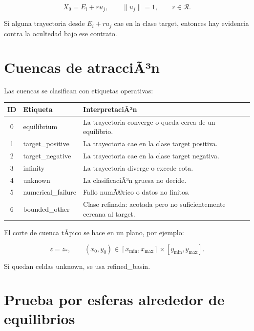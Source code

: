 \documentclass[11pt]{article}
\DeclareRobustCommand{\codepath}[1]{\begingroup\Urlmuskip=0mu plus 2mu\path{#1}\endgroup}
\def\codepath#1{#1}%
\begin{document}
\begin{equation}
X_0=E_i+r u_j,
\qquad
\|u_j\|=1,
\qquad
r\in\mathcal R.
\end{equation}

Si alguna trayectoria desde \(E_i+r u_j\) cae en la clase target, entonces hay evidencia contra la ocultedad bajo ese contrato.

\section{Cuencas de atracciÃ³n}

Las cuencas se clasifican con etiquetas operativas:

\begin{center}
\small
\begin{tabular}{@{}cL{0.32\textwidth}L{0.46\textwidth}@{}}
\toprule
ID & Etiqueta & InterpretaciÃ³n\\
 & \codepath{equilibrium} & La trayectoria converge o queda cerca de un equilibrio.\\
1 & \codepath{target_positive} & La trayectoria cae en la clase target positiva.\\
2 & \codepath{target_negative} & La trayectoria cae en la clase target negativa.\\
3 & \codepath{infinity} & La trayectoria diverge o excede cota.\\
4 & \codepath{unknown} & La clasificaciÃ³n gruesa no decide.\\
5 & \codepath{numerical_failure} & Fallo numÃ©rico o datos no finitos.\\
6 & \codepath{bounded_other} & Clase refinada: acotada pero no suficientemente cercana al target.\\
\bottomrule
\end{tabular}
\end{center}

El corte de cuenca tÃ­pico se hace en un plano, por ejemplo:

\begin{equation}
z=z_\ast,
\qquad
(x_0,y_0)\in[x_{\min},x_{\max}]\times[y_{\min},y_{\max}].
\end{equation}

Si quedan celdas \codepath{unknown}, se usa \codepath{refined_basin}.

\section{Prueba por esferas alrededor de equilibrios}
\end{document}
